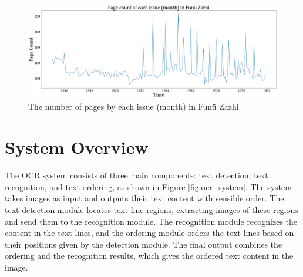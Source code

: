 \documentclass[12pt,twoside]{report}
\begin{document}
\begin{figure}[htbp]
    \centering
    \includegraphics[width=\textwidth]{./figures/fnzz4}
    \caption{The number of pages by each issue (month) in Funü Zazhi}
    \label{fig:fnzz4}
\end{figure}

\section{System Overview}
\label{sec:system_overview}
The OCR system consists of three main components: text detection, text recognition, and text ordering, as shown in Figure \ref{fig:ocr_system}. The system takes images as input and outputs their text content with sensible order. The text detection module locates text line regions, extracting images of these regions and send them to the recognition module. The recognition module recognizes the content in the text lines, and the ordering module orders the text lines based on their positions given by the detection module. The final output combines the ordering and the recognition results, which gives the ordered text content in the image.
\end{document}
